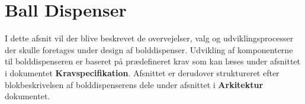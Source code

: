 \documentclass[Rapport/Rapport_main.tex]{subfiles}
\begin{document}
\section{Ball Dispenser}
I dette afsnit vil der blive beskrevet de overvejelser, valg og udviklingsprocesser der skulle foretages under design af bolddispenser. Udvikling af komponenterne til bolddispenseren er baseret på prædefineret krav som kan læses under afsnittet  i dokumentet \textbf{Kravspecifikation}. Afsnittet er derudover struktureret efter blokbeskrivelsen af bolddispenserens dele under afsnittet  i \textbf{Arkitektur} dokumentet.




\end{document}
